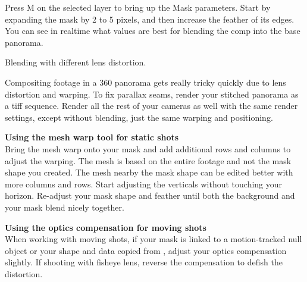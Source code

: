 \begin{fullwidth}

Press M on the selected layer to bring up the Mask parameters. Start by expanding the mask by 2 to 5 pixels, and then increase the feather of its edges. You can see in realtime what values are best for blending the comp into the base panorama. 


{\large Blending with different lens distortion. \par}

Compositing footage in a 360 panorama gets really tricky quickly due to lens distortion and warping. To fix parallax seams, render your stitched panorama as a tiff sequence. Render all the rest of your cameras as well with the same render settings, except without blending, just the same warping and positioning. 

{\bfseries Using the mesh warp tool for static shots}
\\
Bring the mesh warp onto your mask and add additional rows and columns to adjust the warping. The mesh is based on the entire footage and not the mask shape you created. The mesh nearby the mask shape can be edited better with more columns and rows. Start adjusting the verticals without touching your horizon. Re-adjust your mask shape and feather until both the background and your mask blend nicely together.

{\bfseries Using the optics compensation for moving shots}
\\
When working with moving shots, if your mask is linked to a motion-tracked null object or your shape and data copied from \textbf{}, adjust your optics compensation slightly. If shooting with fisheye lens, reverse the compensation to defish the distortion. 



\clearpage
\end{fullwidth}